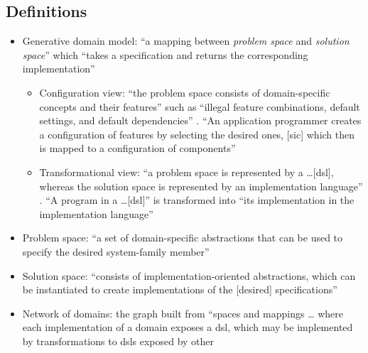 \subsection{Definitions}
\begin{itemize}
      \item Generative domain model: ``a mapping between \emph{problem space}
            and \emph{solution space}'' which ``takes a specification and
            returns the corresponding implementation''
            \cite[p.~330]{czarnecki_overview_2004}
            \begin{itemize}
                  \item Configuration view: ``the problem space consists of
                        domain-specific concepts and their features'' such as
                        ``illegal feature combinations, default settings, and
                        default dependencies'' \cite[p.~331]{czarnecki_overview_2004}.
                        ``An application programmer creates a configuration of
                        features by selecting the desired ones, [sic] which
                        then is mapped to a configuration of components''
                        \cite[p.~331]{czarnecki_overview_2004}
                  \item Transformational view: ``a problem space is represented
                        by a \dots [\acs{dsl}], whereas the solution space is
                        represented by an implementation language''
                        \cite[p.~331]{czarnecki_overview_2004}. ``A program in
                        a \dots [\acs{dsl}]'' is transformed into ``its
                        implementation in the implementation language''
                        \cite[p.~331]{czarnecki_overview_2004}
            \end{itemize}
      \item Problem space: ``a set of domain-specific abstractions that can be
            used to specify the desired system-family member''
            \cite[p.~330]{czarnecki_overview_2004}
      \item Solution space: ``consists of implementation-oriented abstractions,
            which can be instantiated to create implementations of the [desired]
            specifications'' \cite[p.~330]{czarnecki_overview_2004}
      \item Network of domains: the graph built from ``spaces and mappings \dots
            where each implementation of a domain exposes a \acs{dsl}, which may
            be implemented by transformations to \acsp{dsl} exposed by other

\end{itemize}
